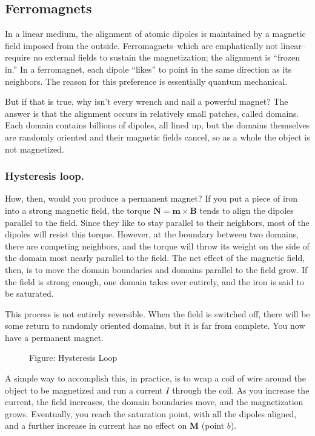 \documentclass[../../../main.tex]{subfiles}
\begin{document}
\subsection{Ferromagnets}
In a linear medium, the alignment of atomic dipoles is maintained by a magnetic ﬁeld imposed from the outside. Ferromagnets--which are emphatically not linear--require no external ﬁelds to sustain the magnetization; the alignment is “frozen in.” In a ferromagnet, each dipole “likes” to point in the same direction as its neighbors. The reason for this preference is essentially quantum mechanical. 

But if that is true, why isn’t every wrench and nail a powerful magnet? The answer is that the alignment occurs in relatively small patches, called domains. Each domain contains billions of dipoles, all lined up, but the domains themselves are randomly oriented and their magnetic ﬁelds cancel, so as a whole the object is not magnetized.

\subsubsection{Hysteresis loop.} How, then, would you produce a permanent magnet? If you put a piece of iron into a strong magnetic ﬁeld, the torque $\mathbf{N} = \mathbf{m} \times \mathbf{B}$ tends to align the dipoles parallel to the ﬁeld. Since they like to stay parallel to their neighbors, most of the dipoles will resist this torque. However, at the boundary between two domains, there are competing neighbors, and the torque will throw its weight on the side of the domain most nearly parallel to the ﬁeld. The net effect of the magnetic ﬁeld, then, is to move the domain boundaries and domains parallel to the ﬁeld grow. If the ﬁeld is strong enough, one domain takes over entirely, and the iron is said to be saturated.

This process is not entirely reversible. When the ﬁeld is switched off, there will be some return to randomly oriented domains, but it is far from complete. You now have a permanent magnet.

\begin{figure}
    \centering
    \caption*{Figure: Hysteresis Loop}
\end{figure}

A simple way to accomplish this, in practice, is to wrap a coil of wire around the object to be magnetized and run a current $I$ through the coil. As you increase the current, the ﬁeld increases, the domain boundaries move, and the magnetization grows. Eventually, you reach the saturation point, with all the dipoles aligned, and a further increase in current has no effect on \textbf{M} (point $b$).
\end{document}
